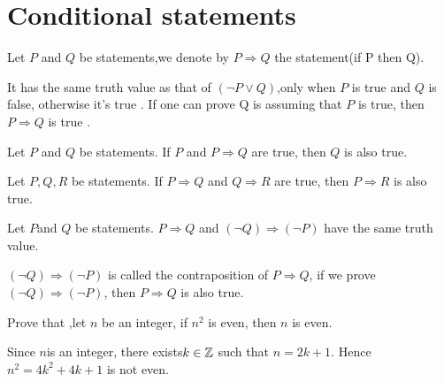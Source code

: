 \documentclass{book}
\numberwithin{equation}{section}
\begin{document}
\section{Conditional statements}
\begin{definitionenv}
    Let $P$ and $Q$ be statements,we denote by $P\Rightarrow Q$ the statement(if P then Q).
\end{definitionenv}
\begin{remark}
    It has the same truth value as that of $(\neg P\vee Q)$,only when $P$ is true and $Q$ is false, otherwise it's true .
    \newline
    If one can prove Q is assuming that $P$ is true, then $P\Rightarrow Q$ is true .
\end{remark}
\begin{propositionenv}
    Let $P$ and $Q$ be statements. If $P$ and $P\Rightarrow Q$ are true, then $Q$ is also true.
\end{propositionenv}
\begin{propositionenv}
    Let $P,Q,R$ be statements. If $P \Rightarrow Q$ and $Q\Rightarrow R$ are true, then $P\Rightarrow R$ is also true.
\end{propositionenv}
\begin{theoremenv}
    Let $P$and $Q$ be statements. $P\Rightarrow Q$ and $(\neg Q)\Rightarrow (\neg P)$ have the same truth value.
\end{theoremenv}
$(\neg Q)\Rightarrow (\neg P)$ is called the contraposition of $P\Rightarrow Q$, if we prove $(\neg Q)\Rightarrow (\neg P)$, then $P\Rightarrow Q$ is also true.
\begin{exampleenv}
    Prove that ,let $n$ be an integer, if $n^2$ is even, then $n$ is even.
    \begin{proofenv}
        Since $n$is an integer, there exists$k\in \mathbb{Z}$ such that $n=2k+1$. Hence $n^2=4k^2+4k+1$ is not even.
    \end{proofenv}
\end{exampleenv}
\end{document}
